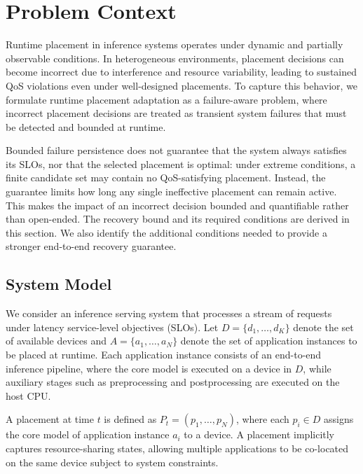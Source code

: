 \documentclass[conference]{IEEEtran}
\begin{document}
\section{Problem Context}
\label{problem_context}

Runtime placement in inference systems operates under dynamic and partially observable conditions.
In heterogeneous environments, placement decisions can become incorrect due to interference and resource variability, leading to sustained QoS violations even under well-designed placements.
%
To capture this behavior, we formulate runtime placement adaptation as a failure-aware problem, where incorrect placement decisions are treated as transient system failures that must be detected and bounded at runtime.

Bounded failure persistence does not guarantee that the system always satisfies its SLOs, nor that the selected placement is optimal: under extreme conditions, a finite candidate set may contain no QoS-satisfying placement.
Instead, the guarantee limits how long any single ineffective placement can remain active. This makes the impact of an incorrect decision bounded and quantifiable rather than open-ended.
The recovery bound and its required conditions are derived in this section. We also identify the additional conditions needed to provide a stronger end-to-end recovery guarantee.



\subsection{System Model}

We consider an inference serving system that processes a stream of requests under latency service-level objectives (SLOs). 
Let $D = \{d_1, \dots, d_K\}$ denote the set of available devices and $A = \{a_1, \dots, a_N\}$ denote the set of application instances to be placed at runtime.
Each application instance consists of an end-to-end inference pipeline, where the core model is executed on a device in $D$, while auxiliary stages such as preprocessing and postprocessing are executed on the host CPU.

A placement at time $t$ is defined as $P_t = (p_1, \dots, p_N)$, where each $p_i \in D$ assigns the core model of application instance $a_i$ to a device. A placement implicitly captures resource-sharing states, allowing multiple applications to be co-located on the same device subject to system constraints.
\end{document}

